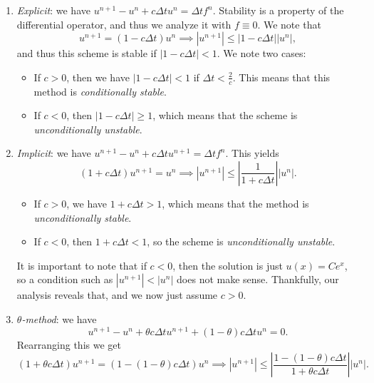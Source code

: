 \begin{enumerate}
    \item \emph{Explicit}: we have $u^{n+1}-u^n + c\Delta t u^n = \Delta t f^n$. Stability is a property of the differential operator, and thus we analyze it with $f\equiv 0$. We note that
    \begin{equation*}
        u^{n+1} = (1-c\Delta t)u^n \implies |u^{n+1}|\leq |1-c\Delta t||u^n|,
    \end{equation*}
    and thus this scheme is stable if $|1-c\Delta t|< 1$. We note two cases:
    \begin{itemize}
        \item If $c > 0$, then we have $|1-c\Delta t|<1$ if $\Delta t < \frac{2}{c}$. This means that this method is \emph{conditionally stable}. 
        \item If $c< 0$, then $|1-c\Delta t|\geq 1$, which means that the scheme is \emph{unconditionally unstable}.
    \end{itemize} 
    \item \emph{Implicit}: we have $u^{n+1}-u^n + c\Delta tu^{n+1} = \Delta t f^n$. This yields
    \begin{equation*}
        (1+c\Delta t) u^{n+1} = u^n \implies |u^{n+1}| \leq \left|\frac{1}{1+c\Delta t}\right| |u^{n}|.
    \end{equation*}
    \begin{itemize}
        \item If $c > 0$,  we have $1+c\Delta t >1$, which means that the method is \emph{unconditionally stable}. 
        \item If $c < 0$, then $1+c\Delta t <1$, so the scheme is \emph{unconditionally unstable}.
    \end{itemize}     
    It is important to note that if $c<0$, then the solution is just $u(x) = Ce^x$, so a condition such as $|u^{n+1}|<|u^n|$ does not make sense. Thankfully, our analysis reveals that, and we now just assume $c>0$. 
    \item \emph{$\theta$-method}: we have
    \begin{equation*}
        u^{n+1}-u^n + \theta c\Delta t u^{n+1} + (1-\theta)c\Delta t u^n = 0.
    \end{equation*}
    Rearranging this we get
    \begin{equation*}
        (1+\theta c\Delta t)u^{n+1} = (1- (1-\theta)c\Delta t) u^n \implies |u^{n+1}| \leq \left|\frac{1-(1-\theta)c\Delta t}{1+\theta c\Delta t}\right| |u^n|.
    \end{equation*}

\end{enumerate}
